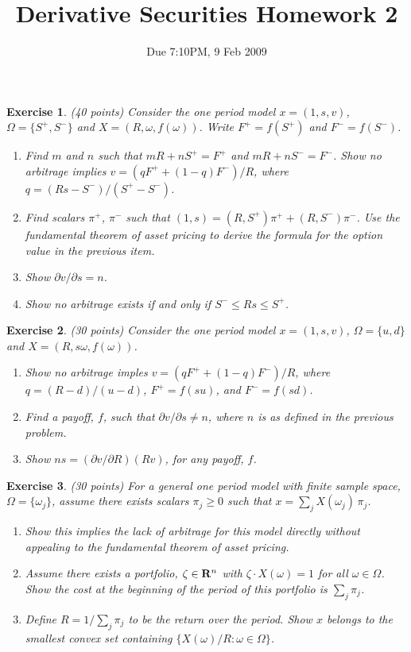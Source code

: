 \documentclass[11pt,fleqn]{amsproc}
\newcommand{\R}{{\bf R}}
\newtheorem{xca}{Exercise}
\begin{document}
\title{Derivative Securities Homework 2}
\author{Due 7:10PM, 9 Feb 2009}

\maketitle

\begin{xca}{(40 points)}
Consider the one period model $x = (1, s, v)$, $\Omega = \{S^+, S^-\}$ and $X = (R, \omega, f(\omega))$.
Write $F^+ = f(S^+)$ and $F^- = f(S^-)$.
\begin{enumerate}
\item Find $m$ and $n$ such that $m R + n S^+ = F^+$ and $m R + n S^- = F^-$. Show no arbitrage
implies $v = (qF^+ + (1 - q)F^-)/R$, where $q = (Rs - S^-)/(S^+ - S^-)$.
\item Find scalars $\pi^+$, $\pi^-$ such that $(1, s) = (R, S^+)\pi^+ + (R, S^-)\pi^-$. Use the fundamental theorem of asset pricing to derive the formula for the option value in the previous item.
\item Show $\partial v/\partial s = n$.
\item Show no arbitrage exists if and only if $S^-\le Rs \le S^+$.
\end{enumerate}
\end{xca}

\begin{xca}{(30 points)}
Consider the one period model $x = (1, s, v)$, $\Omega = \{u, d\}$ and $X = (R, s\omega, f(\omega))$.
\begin{enumerate}
\item Show no arbitrage imples $v = (qF^+ + (1 - q)F^-)/R$, where $q = (R - d)/(u - d)$,
$F^+ = f(su)$, and $F^- = f(sd)$.
\item Find a payoff, $f$, such that $\partial v/\partial s \not= n$, where $n$ is as defined in the
previous problem.
\item Show $ns = (\partial v/\partial R)(Rv)$, for any payoff, $f$.
\end{enumerate}

\end{xca}

\begin{xca}{(30 points)}
For a general one period model with finite sample space, $\Omega = \{\omega_j\}$, assume there exists
scalars $\pi_j\ge0$ such that $x = \sum_j X(\omega_j)\,\pi_j$.
\begin{enumerate}
\item Show this implies the lack of arbitrage for this model directly without appealing to
the fundamental theorem of asset pricing.
\item Assume there exists a portfolio, $\zeta\in\R^n$ with $\zeta\cdot X(\omega) = 1$ for all $\omega\in\Omega$. Show the cost at the beginning of the period of this portfolio is $\sum_j \pi_j$.
\item Define $R = 1/\sum_j \pi_j$ to be the return over the period. Show $x$ belongs
to the smallest convex set containing $\{X(\omega)/R : \omega\in\Omega\}$.
\end{enumerate}
\end{xca}
\end{document}
